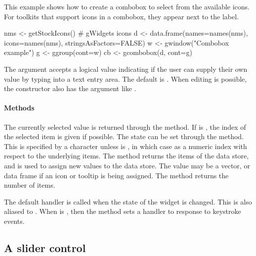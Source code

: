 
This example shows how to create a combobox to select from the
available icons. For toolkits that support icons in a combobox, they
appear next to the label.
\begin{Schunk}
\begin{Sinput}
 nms <- getStockIcons()                  # gWidgets icons
 d <- data.frame(names=names(nms), icons=names(nms), 
                 stringsAsFactors=FALSE)
 w <- gwindow("Combobox example")
 g <- ggroup(cont=w)
 cb <- gcombobox(d, cont=g)
\end{Sinput}
\end{Schunk}


The argument  accepts a logical value
indicating if the user can supply their own value by typing into a
text entry area. The default is . When editing is
possible, the constructor also has the
 argument like .

\paragraph{Methods}
The currently selected value is returned through the
 method. If  is , the
index of the selected item is given if possible. The state can be set
through the  method. This is
specified by a character unless  is , in which
case as a numeric index with respect to the underlying items. The
\method{[}{gcombobox} method returns the items of the data store, and
\method{[\ASSIGN}{gcombobox} is used to assign new values to the data
store. The value may be a vector, or data frame if an icon or tooltip
is being assigned. The  method returns the
number of items.

The default handler is called when the state of the widget is
changed. This is also aliased to
. When  is
, then the  method
sets a handler to response to keystroke events.



\subsection{A slider control}
\label{sec:gWidgets-slider-control}


